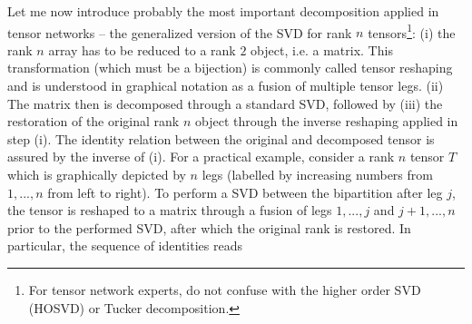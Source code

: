 Let me now introduce probably the most important decomposition applied in tensor networks -- the generalized version of the SVD for rank $n$ tensors\footnote{For tensor network experts, do not confuse with the higher order SVD (HOSVD) or Tucker decomposition.}:
(i) the rank $n$ array has to be reduced to a rank $2$ object, i.e. a matrix.
This transformation (which must be a bijection) is commonly called tensor reshaping and is understood in graphical notation as a fusion of multiple tensor legs.
(ii) The matrix then is decomposed through a standard SVD, followed by (iii) the restoration of the original rank $n$ object through the inverse reshaping applied in step (i).
The identity relation between the original and decomposed tensor is assured by the inverse of (i).
For a practical example, consider a rank $n$ tensor $T$ which is graphically depicted by $n$ legs (labelled by increasing numbers from $1,...,n$ from left to right).
To perform a SVD between the bipartition after leg $j$, the tensor is reshaped to a matrix through a fusion of legs $1,...,j$ and $j+1,...,n$ prior to the performed SVD, after which the original rank is restored.
In particular, the sequence of identities reads
